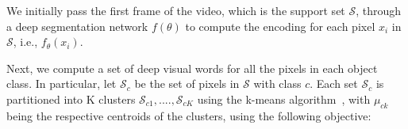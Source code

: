 \documentclass[10pt,twocolumn,letterpaper]{article}
\newcommand{\HB}[1]{{\color{blue}{HB: #1}}} %
\begin{document}
We initially pass the first frame of the video, which is the support set $\mathcal{S}$, through a deep segmentation network $f(\theta)$ to compute the encoding for each pixel $x_i$ in $\mathcal{S}$, i.e., $f_\theta(x_i)$. 

Next, we compute a set of deep visual words for all the pixels in each object class. In particular, let $\mathcal{S}_c$ be the set of pixels in $\mathcal{S}$ with class $c$. Each set $\mathcal{S}_c$ is partitioned into K clusters $\mathcal{S}_{c1}, ...., \mathcal{S}_{cK}$ using the k-means algorithm~\cite{kmeans}, with $\mu_{ck}$ being the respective centroids of the clusters, using the following objective:
\end{document}
